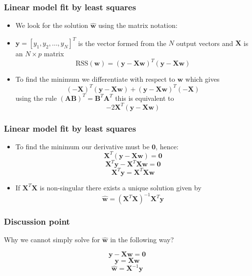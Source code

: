 \documentclass[notes]{beamer}          %
\newcommand{\vect}[1]{\bm{#1}}
\begin{document}
\begin{frame}
\frametitle{Linear model fit by least squares}
    \begin{itemize}
        \item We look for the solution $\hat{\vect{w}}$ using the matrix notation:
        \item $\vect{y} = [y_1, y_2, \ldots, y_N]^T$ is the vector formed from the $N$ output vectors and $\vect{X}$ is an $N \times p$ matrix  \\
        $$\mbox{RSS}(\vect{w}) =  (\vect{y} - \vect{X} \vect{w})^T (\vect{y} - \vect{X} \vect{w})$$
        \item To find the minimum we differentiate with respect to $\vect{w}$ which gives
        $$(-\vect{X})^T(\vect{y}-\vect{X}\vect{w}) + (\vect{y}-\vect{X}\vect{w})^T (-\vect{X})$$
        using the rule $(\vect{A}\vect{B})^T = \vect{B}^T\vect{A}^T$ this is equivalent to
        $$ -2 \vect{X}^T(\vect{y}-\vect{X}\vect{w})$$
    \end{itemize}
\end{frame}

\begin{frame}
\frametitle{Linear model fit by least squares}
    \begin{itemize}

    \item To find the minimum our derivative must be $\vect{0}$, hence:
        $$\vect{X}^T(\vect{y}-\vect{X}\vect{w}) =  \vect{0}$$
        $$\vect{X}^T \vect{y} -\vect{X}^T\vect{X}\vect{w} =  \vect{0}$$
        $$ \vect{X}^T \vect{y} = \vect{X}^T\vect{X}\vect{w}$$
    \item    If $\vect{X}^T\vect{X}$ is non-singular there exists a unique solution given by
        $$\hat{\vect{w}} = (\vect{X}^T\vect{X})^{-1}\vect{X}^T \vect{y}$$
    \end{itemize}

\end{frame}

\begin{frame}
\frametitle{Discussion point}

Why we cannot simply solve for $\hat{\vect{w}}$ in the following way?

$$\vect{y} -\vect{X}\vect{w}=  \vect{0}$$ 
$$\vect{y} = \vect{X}\vect{w}$$ 
$$\hat{\vect{w}} = \vect{X}^{-1} \vect{y}$$

\end{frame}
\end{document}
